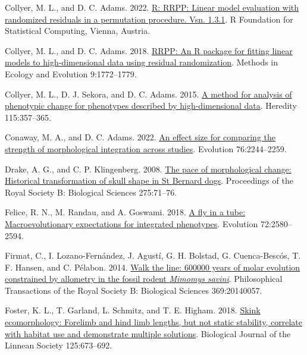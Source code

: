 \documentclass[
  11pt,
]{article}
\newlength{\cslhangindent}
\newlength{\cslentryspacingunit} %
\newenvironment{CSLReferences}[2] %
 {%
  \setlength{\parindent}{0pt}
  \ifodd #1
  \let\oldpar\par
  \def\par{\hangindent=\cslhangindent\oldpar}
  \fi
  \setlength{\parskip}{#2\cslentryspacingunit}
 }%
 {}
\begin{document}
\begin{CSLReferences}{1}{0}
\leavevmode{}%
Collyer, M. L., and D. C. Adams. 2022.
\href{https://CRAN.R-project.org/package=RRPP}{R: RRPP: Linear model
evaluation with randomized residuals in a permutation procedure. Vsn.
1.3.1}. R Foundation for Statistical Computing, Vienna, Austria.

\leavevmode{}%
Collyer, M. L., and D. C. Adams. 2018.
\href{https://doi.org/10.1111/2041-210X.13029}{RRPP: An {R} package for
fitting linear models to high-dimensional data using residual
randomization}. Methods in Ecology and Evolution 9:1772--1779.

\leavevmode{}%
Collyer, M. L., D. J. Sekora, and D. C. Adams. 2015.
\href{https://doi.org/10.1038/hdy.2014.75}{A method for analysis of
phenotypic change for phenotypes described by high-dimensional data}.
Heredity 115:357--365.

\leavevmode{}%
Conaway, M. A., and D. C. Adams. 2022.
\href{https://doi.org/10.1111/evo.14595}{An effect size for comparing
the strength of morphological integration across studies}. Evolution
76:2244--2259.

\leavevmode{}%
Drake, A. G., and C. P. Klingenberg. 2008.
\href{https://doi.org/10.1098/rspb.2007.1169}{The pace of morphological
change: Historical transformation of skull shape in {S}t {B}ernard
dogs}. Proceedings of the Royal Society B: Biological Sciences
275:71--76.

\leavevmode{}%
Felice, R. N., M. Randau, and A. Goswami. 2018.
\href{https://doi.org/10.1111/evo.13608}{A fly in a tube:
Macroevolutionary expectations for integrated phenotypes}. Evolution
72:2580--2594.

\leavevmode{}%
Firmat, C., I. Lozano-Fernández, J. Agustí, G. H. Bolstad, G.
Cuenca-Bescós, T. F. Hansen, and C. Pélabon. 2014.
\href{https://doi.org/10.1098/rstb.2014.0057}{Walk the line: 600000
years of molar evolution constrained by allometry in the fossil rodent
\emph{{M}imomys savini}}. Philosophical Transactions of the Royal
Society B: Biological Sciences 369:20140057.

\leavevmode{}%
Foster, K. L., T. Garland, L. Schmitz, and T. E. Higham. 2018.
\href{https://doi.org/10.1093/biolinnean/bly146}{{Skink ecomorphology:
Forelimb and hind limb lengths, but not static stability, correlate with
habitat use and demonstrate multiple solutions}}. Biological Journal of
the Linnean Society 125:673--692.


\end{CSLReferences}
\end{document}
